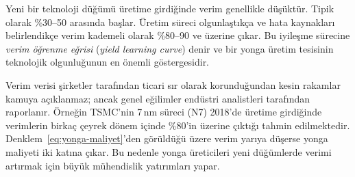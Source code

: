 Yeni bir teknoloji düğümü üretime girdiğinde verim genellikle düşüktür. Tipik olarak \%30--50 arasında başlar. Üretim süreci olgunlaştıkça ve hata kaynakları belirlendikçe verim kademeli olarak \%80--90 ve üzerine çıkar. Bu iyileşme sürecine \emph{verim öğrenme eğrisi} (\emph{yield learning curve}) denir ve bir yonga üretim tesisinin teknolojik olgunluğunun en önemli göstergesidir.

Verim verisi şirketler tarafından ticari sır olarak korunduğundan kesin rakamlar kamuya açıklanmaz; ancak genel eğilimler endüstri analistleri tarafından raporlanır. Örneğin TSMC'nin 7\,nm süreci (N7) 2018'de üretime girdiğinde verimlerin birkaç çeyrek dönem içinde \%80'in üzerine çıktığı tahmin edilmektedir. Denklem~\ref{eq:yonga-maliyet}'den görüldüğü üzere verim yarıya düşerse yonga maliyeti iki katına çıkar. Bu nedenle yonga üreticileri yeni düğümlerde verimi artırmak için büyük mühendislik yatırımları yapar.

